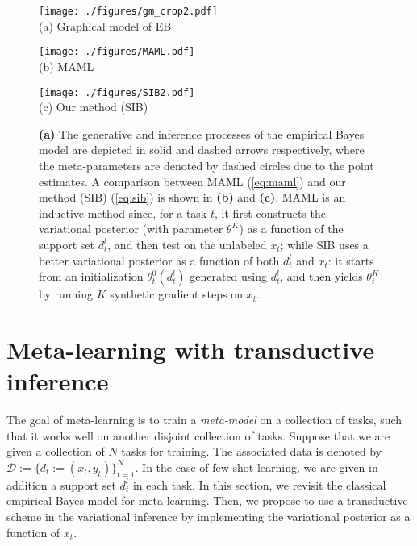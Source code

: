 \documentclass{article} \usepackage{iclr2020_conference,times}
\def\eqref#1{(\ref{#1})}
\def\gD{{\mathcal{D}}}
\newcommand{\supp}{l}
\begin{document}
\begin{figure*}[t]
	\centering
	\begin{minipage}{.28\textwidth}
		\centering
		\texttt{[image: ./figures/gm\_crop2.pdf]}\\
        (a) Graphical model of EB
	\end{minipage}
	\hfill
	\begin{minipage}{.35\textwidth}
		\centering
		\texttt{[image: ./figures/MAML.pdf]}\\
        (b) MAML
	\end{minipage} 
	\hfill
	\begin{minipage}{.35\textwidth}
		\centering
		\texttt{[image: ./figures/SIB2.pdf]}\\
        (c) Our method (SIB)
	\end{minipage}
    \caption{\textbf{(a)} The generative and inference processes of the empirical Bayes model 
    are depicted in solid and dashed arrows respectively, 
    where the meta-parameters are denoted by dashed circles due to the point estimates.
    A comparison between MAML \eqref{eq:maml} and our method (SIB) \eqref{eq:sib} is shown in \textbf{(b)} and \textbf{(c)}.
    MAML is an inductive method since, for a task $t$, it first constructs the variational posterior (with parameter $\theta^K$) as a function of the support set $d_t^\supp$,
    and then test on the unlabeled $x_t$; while SIB uses a better variational posterior as a function of both $d_t^\supp$ and $x_t$:
    it starts from an initialization $\theta_t^0(d_t^\supp)$ generated using $d_t^\supp$, and then yields $\theta_t^K$ by running $K$ synthetic gradient steps on $x_t$.
    }
\label{fig:intro}
\end{figure*}


 \section{Meta-learning with transductive inference}
\label{sec:model}

The goal of meta-learning is to train a \emph{meta-model} on a collection of tasks,
such that it works well on another disjoint collection of tasks.
Suppose that we are given a collection of $N$ tasks for training. 
The associated data is denoted by $\gD := \{d_t := (x_t, y_t) \}_{t=1}^N$. 
In the case of few-shot learning, 
we are given in addition a support set $d_t^\supp$ in each task. 
In this section, we revisit the classical empirical Bayes model for meta-learning. Then, 
we propose to use a transductive scheme in the variational inference by implementing the variational posterior as a function of $x_t$. 
\end{document}

